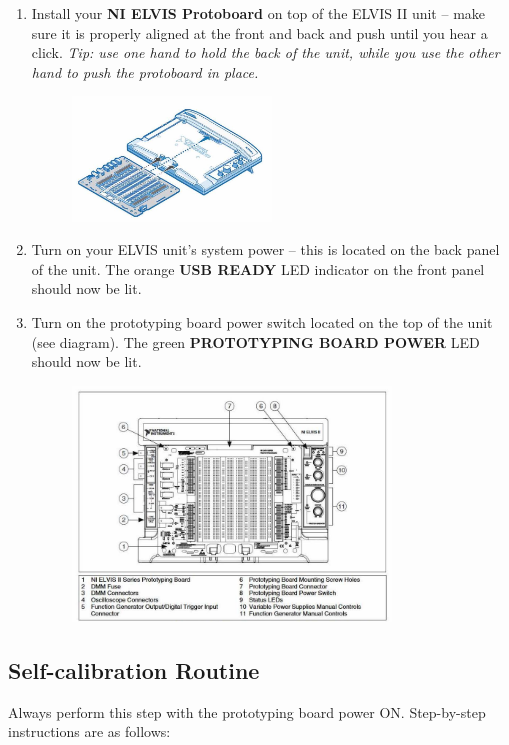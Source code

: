 \documentclass{article}
\begin{document}
\begin{enumerate}
	\item Install your \textbf{NI ELVIS Protoboard} on top of the ELVIS II unit – make sure it is properly aligned at the front and back and push until you hear a click. \textit{Tip: use one hand to hold the back of the unit, while you use the other hand to push the protoboard in place.}
		\begin{figure}[h]
    	\includegraphics[width=0.5\textwidth]{lab_1_fig_1.jpg}
    	\centering
		\end{figure}
	\item Turn on your ELVIS unit’s system power – this is located on the back panel of the unit. The orange \textbf{USB READY} LED indicator on the front panel should now be lit.
	\item Turn on the prototyping board power switch located on the top of the unit (see diagram). The green \textbf{PROTOTYPING BOARD POWER} LED should now be lit.
		\begin{figure}[h!]
    	\includegraphics[width=0.8\textwidth]{lab_1_fig_2.jpg}
    	\centering
		\end{figure}
\end{enumerate}

\subsection*{Self-calibration Routine}
Always perform this step with the prototyping board power ON. Step-by-step instructions are as follows:
\end{document}
